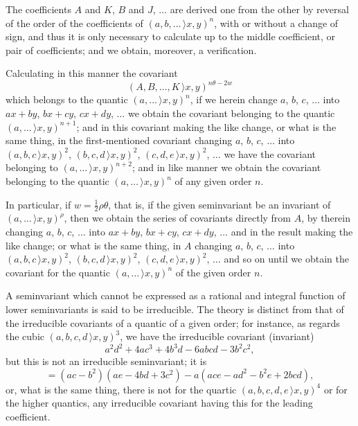 \documentclass[11pt,a4paper]{article}
\begin{document}
\medskip
The coefficients $A$ and $K$, $B$ and $J$, $\ldots$ are derived one from the other by reversal of the order of the coefficients of $(a, b, \ldots\,\rangle x, y)^{n}$, with or without a change of sign, and thus it is only necessary to calculate up to the middle coefficient, or pair of coefficients; and we obtain, moreover, a verification.

\medskip
Calculating in this manner the covariant
\[
(A, B, \ldots, K\,\rangle x, y)^{n\theta - 2w}
\]
which belongs to the quantic $(a, \ldots\,\rangle x, y)^{n}$, if we herein change $a$, $b$, $c$, $\ldots$ into $ax + by$, $bx + cy$, $cx + dy$, $\ldots$ we obtain the covariant belonging to the quantic $(a, \ldots\,\rangle x, y)^{n+1}$; and in this covariant making the like change, or what is the same thing, in the first-mentioned covariant changing $a$, $b$, $c$, $\ldots$ into $(a, b, c\,\rangle x, y)^{2}$, $(b, c, d\,\rangle x, y)^{2}$, $(c, d, e\,\rangle x, y)^{2}$, $\ldots$ we have the covariant belonging to $(a, \ldots\,\rangle x, y)^{n+2}$; and in like manner we obtain the covariant belonging to the quantic $(a, \ldots\,\rangle x, y)^{n}$ of any given order $n$.

\medskip
In particular, if $w = \tfrac{1}{2}\rho\theta$, that is, if the given seminvariant be an invariant of $(a, \ldots\,\rangle x, y)^{\rho}$, then we obtain the series of covariants directly from $A$, by therein changing $a$, $b$, $c$, $\ldots$ into $ax + by$, $bx + cy$, $cx + dy$, $\ldots$ and in the result making the like change; or what is the same thing, in $A$ changing $a$, $b$, $c$, $\ldots$ into $(a, b, c\,\rangle x, y)^{2}$, $(b, c, d\,\rangle x, y)^{2}$, $(c, d, e\,\rangle x, y)^{2}$, $\ldots$ and so on until we obtain the covariant for the quantic $(a, \ldots\,\rangle x, y)^{n}$ of the given order $n$.

\medskip
A seminvariant which cannot be expressed as a rational and integral function of lower seminvariants is said to be irreducible. The theory is distinct from that of the irreducible covariants of a quantic of a given order; for instance, as regards the cubic $(a, b, c, d\,\rangle x, y)^{3}$, we have the irreducible covariant (invariant)
\[
a^{2}d^{2} + 4ac^{3} + 4b^{3}d - 6abcd - 3b^{2}c^{2},
\]
but this is not an irreducible seminvariant; it is
\[
= (ac - b^{2})(ae - 4bd + 3c^{2}) - a(ace - ad^{2} - b^{2}e + 2bcd),
\]
or, what is the same thing, there is not for the quartic $(a, b, c, d, e\,\rangle x, y)^{4}$ or for the higher quantics, any irreducible covariant having this for the leading coefficient.
\clearpage
\end{document}
